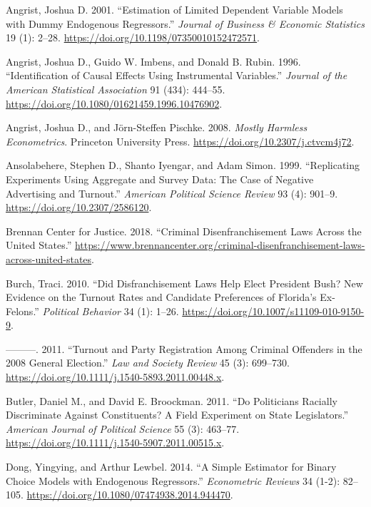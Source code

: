 \documentclass[
  12pt,
]{article}
\newlength{\cslhangindent}
\newenvironment{cslreferences}%
  {\setlength{\parindent}{0pt}%
  \everypar{\setlength{\hangindent}{\cslhangindent}}\ignorespaces}%
  {\par}
\begin{document}
\hypertarget{refs}{}
\begin{cslreferences}
\leavevmode\hypertarget{ref-Angrist2001}{}%
Angrist, Joshua D. 2001. ``Estimation of Limited Dependent Variable Models with Dummy Endogenous Regressors.'' \emph{Journal of Business \& Economic Statistics} 19 (1): 2--28. \url{https://doi.org/10.1198/07350010152472571}.

\leavevmode\hypertarget{ref-Angrist1996}{}%
Angrist, Joshua D., Guido W. Imbens, and Donald B. Rubin. 1996. ``Identification of Causal Effects Using Instrumental Variables.'' \emph{Journal of the American Statistical Association} 91 (434): 444--55. \url{https://doi.org/10.1080/01621459.1996.10476902}.

\leavevmode\hypertarget{ref-Angrist2008}{}%
Angrist, Joshua D., and Jörn-Steffen Pischke. 2008. \emph{Mostly Harmless Econometrics}. Princeton University Press. \url{https://doi.org/10.2307/j.ctvcm4j72}.

\leavevmode\hypertarget{ref-Ansolabehere1999}{}%
Ansolabehere, Stephen D., Shanto Iyengar, and Adam Simon. 1999. ``Replicating Experiments Using Aggregate and Survey Data: The Case of Negative Advertising and Turnout.'' \emph{American Political Science Review} 93 (4): 901--9. \url{https://doi.org/10.2307/2586120}.

\leavevmode\hypertarget{ref-bcj_laws}{}%
Brennan Center for Justice. 2018. ``Criminal Disenfranchisement Laws Across the United States.'' \url{https://www.brennancenter.org/criminal-disenfranchisement-laws-across-united-states}.

\leavevmode\hypertarget{ref-Burch2010}{}%
Burch, Traci. 2010. ``Did Disfranchisement Laws Help Elect President Bush? New Evidence on the Turnout Rates and Candidate Preferences of Florida's Ex-Felons.'' \emph{Political Behavior} 34 (1): 1--26. \url{https://doi.org/10.1007/s11109-010-9150-9}.

\leavevmode\hypertarget{ref-Burch2011}{}%
---------. 2011. ``Turnout and Party Registration Among Criminal Offenders in the 2008 General Election.'' \emph{Law and Society Review} 45 (3): 699--730. \url{https://doi.org/10.1111/j.1540-5893.2011.00448.x}.

\leavevmode\hypertarget{ref-Butler2011}{}%
Butler, Daniel M., and David E. Broockman. 2011. ``Do Politicians Racially Discriminate Against Constituents? A Field Experiment on State Legislators.'' \emph{American Journal of Political Science} 55 (3): 463--77. \url{https://doi.org/10.1111/j.1540-5907.2011.00515.x}.

\leavevmode\hypertarget{ref-Dong2014}{}%
Dong, Yingying, and Arthur Lewbel. 2014. ``A Simple Estimator for Binary Choice Models with Endogenous Regressors.'' \emph{Econometric Reviews} 34 (1-2): 82--105. \url{https://doi.org/10.1080/07474938.2014.944470}.


\end{cslreferences}
\end{document}
